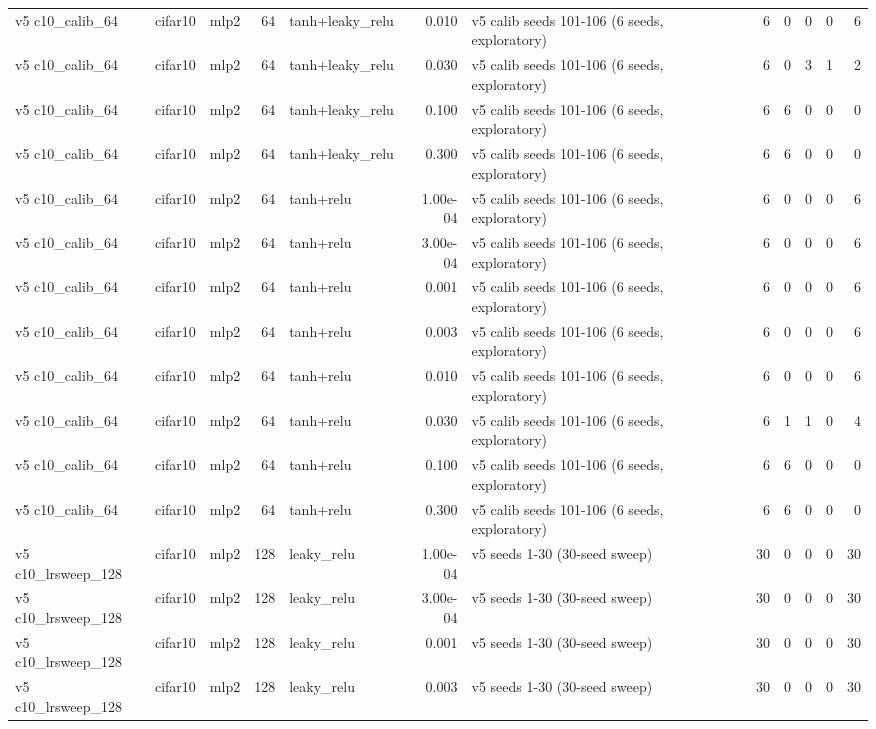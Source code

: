 \begin{table}[htbp]
{\begin{tabular}{@{}lllrlrlrrrrr@{}}
v5 c10\_calib\_64 & cifar10 & mlp2 & 64 & tanh+leaky\_relu & 0.010 & v5 calib seeds 101-106 (6 seeds, exploratory) & 6 & 0 & 0 & 0 & 6 \\
v5 c10\_calib\_64 & cifar10 & mlp2 & 64 & tanh+leaky\_relu & 0.030 & v5 calib seeds 101-106 (6 seeds, exploratory) & 6 & 0 & 3 & 1 & 2 \\
v5 c10\_calib\_64 & cifar10 & mlp2 & 64 & tanh+leaky\_relu & 0.100 & v5 calib seeds 101-106 (6 seeds, exploratory) & 6 & 6 & 0 & 0 & 0 \\
v5 c10\_calib\_64 & cifar10 & mlp2 & 64 & tanh+leaky\_relu & 0.300 & v5 calib seeds 101-106 (6 seeds, exploratory) & 6 & 6 & 0 & 0 & 0 \\
v5 c10\_calib\_64 & cifar10 & mlp2 & 64 & tanh+relu & 1.00e-04 & v5 calib seeds 101-106 (6 seeds, exploratory) & 6 & 0 & 0 & 0 & 6 \\
v5 c10\_calib\_64 & cifar10 & mlp2 & 64 & tanh+relu & 3.00e-04 & v5 calib seeds 101-106 (6 seeds, exploratory) & 6 & 0 & 0 & 0 & 6 \\
v5 c10\_calib\_64 & cifar10 & mlp2 & 64 & tanh+relu & 0.001 & v5 calib seeds 101-106 (6 seeds, exploratory) & 6 & 0 & 0 & 0 & 6 \\
v5 c10\_calib\_64 & cifar10 & mlp2 & 64 & tanh+relu & 0.003 & v5 calib seeds 101-106 (6 seeds, exploratory) & 6 & 0 & 0 & 0 & 6 \\
v5 c10\_calib\_64 & cifar10 & mlp2 & 64 & tanh+relu & 0.010 & v5 calib seeds 101-106 (6 seeds, exploratory) & 6 & 0 & 0 & 0 & 6 \\
v5 c10\_calib\_64 & cifar10 & mlp2 & 64 & tanh+relu & 0.030 & v5 calib seeds 101-106 (6 seeds, exploratory) & 6 & 1 & 1 & 0 & 4 \\
v5 c10\_calib\_64 & cifar10 & mlp2 & 64 & tanh+relu & 0.100 & v5 calib seeds 101-106 (6 seeds, exploratory) & 6 & 6 & 0 & 0 & 0 \\
v5 c10\_calib\_64 & cifar10 & mlp2 & 64 & tanh+relu & 0.300 & v5 calib seeds 101-106 (6 seeds, exploratory) & 6 & 6 & 0 & 0 & 0 \\
v5 c10\_lrsweep\_128 & cifar10 & mlp2 & 128 & leaky\_relu & 1.00e-04 & v5 seeds 1-30 (30-seed sweep) & 30 & 0 & 0 & 0 & 30 \\
v5 c10\_lrsweep\_128 & cifar10 & mlp2 & 128 & leaky\_relu & 3.00e-04 & v5 seeds 1-30 (30-seed sweep) & 30 & 0 & 0 & 0 & 30 \\
v5 c10\_lrsweep\_128 & cifar10 & mlp2 & 128 & leaky\_relu & 0.001 & v5 seeds 1-30 (30-seed sweep) & 30 & 0 & 0 & 0 & 30 \\
v5 c10\_lrsweep\_128 & cifar10 & mlp2 & 128 & leaky\_relu & 0.003 & v5 seeds 1-30 (30-seed sweep) & 30 & 0 & 0 & 0 & 30 \\

\end{tabular}}
\end{table}
